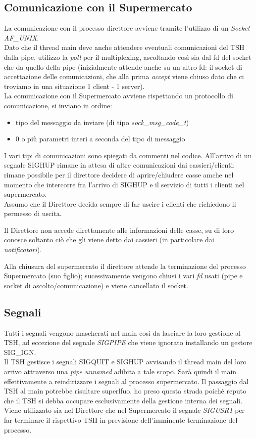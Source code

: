 \documentclass[11pt, a4paper]{article}
\begin{document}
\subsection{Comunicazione con il Supermercato}
La comunicazione con il processo direttore avviene tramite l'utilizzo di un \textit{Socket AF\_UNIX}.\\
Dato che il thread main deve anche attendere eventuali comunicazioni del TSH dalla pipe, utilizzo la \textit{poll} per il multiplexing, ascoltando così sia dal fd del socket che da quello della pipe (inizialmente attende anche su un altro fd: il socket di accettazione delle comunicazioni, che alla prima \textit{accept} viene chiuso dato che ci troviamo in una situazione 1 client - 1 server).\\
La comunicazione con il Supermercato avviene rispettando un protocollo di comunicazione, si inviano in ordine:
\begin{itemize}
\item tipo del messaggio da inviare (di tipo \textit{sock\_msg\_code\_t})
\item 0 o più parametri interi a seconda del tipo di messaggio
\end{itemize}
I vari tipi di comunicazioni sono spiegati da commenti nel codice.
All'arrivo di un segnale SIGHUP rimane in attesa di altre comunicazioni dai cassieri/clienti: rimane possibile per il direttore decidere di aprire/chiudere casse amche nel momento che intercorre fra l'arrivo di SIGHUP e il servizio di tutti i clienti nel supermercato.\\
Assumo che il Direttore decida sempre di far uscire i clienti che richiedono il permesso di uscita.

Il Direttore non accede direttamente alle informazioni delle casse, su di loro conosce soltanto ciò che gli viene detto dai cassieri (in particolare dai \textit{notificatori}).

Alla chiusura del supermercato il direttore attende la terminazione del processo Supermercato (suo figlio); sucessivamente vengono chiusi i vari \textit{fd} usati (pipe e socket di ascolto/comunicazione) e viene cancellato il socket.
\subsection{Segnali}
Tutti i segnali vengono mascherati nel main così da lasciare la loro gestione al TSH, ad eccezione del segnale \textit{SIGPIPE} che viene ignorato installando un gestore SIG\_IGN.\\
Il TSH gestisce i segnali SIGQUIT e SIGHUP avvisando il thread main del loro arrivo attraverso una \textit{pipe unnamed} adibita a tale scopo. Sarà quindi il main effettivamente a reindirizzare i segnali al processo supermercato. Il passaggio dal TSH al main potrebbe risultare superlfuo, ho preso questa strada poichè reputo che il TSH si debba occupare esclusivamente della gestione interna dei segnali.\\
Viene utilizzato sia nel Direttore che nel Supermercato il segnale \textit{SIGUSR1} per far terminare il rispettivo TSH in previsione dell'imminente terminazione del processo.
\end{document}
